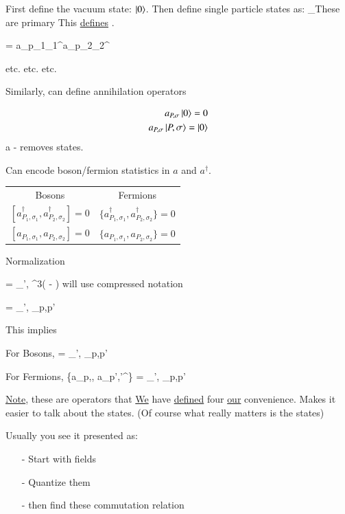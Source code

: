 {First define the vacuum state: $\ket{0}$.
Then define single particle states as:
\be
{}_{\textrm{These are primary}} \equiv \adagger {}
\ee
This \underline{defines} \adagger.



\be
{} = a_{p_1\sigma_1}^\dagger a_{p_2\sigma_2}^\dagger {}
\ee

etc. etc. etc.


Similarly,  can define annihilation operators


\begin{align*}
a_{P,\sigma} \ket{0} = 0\\
a_{P,\sigma} \ket{P,\sigma} = \ket{0}
\end{align*}
a - removes states. 


Can encode boson/fermion statistics in $a$ and $a^\dagger$.

\begin{center}
\begin{tabular}{c|c}
Bosons & Fermions \\
$[a_{P_1,\sigma_1}^\dagger, a_{P_2,\sigma_2}^\dagger] = 0 $  &  $\{a_{P_1,\sigma_1}^\dagger, a_{P_2,\sigma_2}^\dagger\} = 0 $\\  
$[a_{P_1,\sigma_1}, a_{P_2,\sigma_2}] = 0  $  &  $\{a_{P_1,\sigma_1}, a_{P_2,\sigma_2}\} = 0  $\\  
\end{tabular}
\end{center}


Normalization

\be
{} = \delta_{\sigma',\sigma} \delta^3( - )
\ee 
will use compressed notation

\be
{} = \delta_{\sigma',\sigma} \delta_{p,p'}
\ee 

This implies

For Bosons,
 = \delta_{\sigma',\sigma} \delta_{p,p'}
\ee


For Fermions,
\be
\{a_{p,\sigma}, a_{p',\sigma'}^\dagger\} = \delta_{\sigma',\sigma} \delta_{p,p'}
\ee

\underline{Note}, these are operators that \underline{We} have \underline{defined} four \underline{our} convenience.
Makes it easier to talk about the states.  (Of course what really matters is the states)

\clearpage

Usually you see it presented as:
\begin{itemize}
\item[-] Start with fields
\item[-] Quantize them
\item[-] then find these commutation relation
\end{itemize}

}
